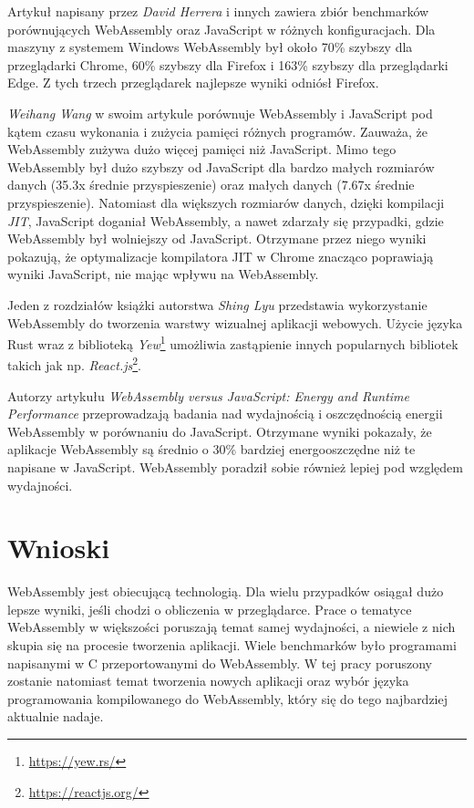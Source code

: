 \documentclass[language=polish,type=master]{aghmodern}
\begin{document}
Artykuł \cite{wasm_js_bench} napisany przez \emph{David Herrera} i innych zawiera zbiór benchmarków porównujących WebAssembly oraz JavaScript w różnych konfiguracjach.
Dla maszyny z systemem Windows WebAssembly był około 70\% szybszy dla przeglądarki Chrome, 60\% szybszy dla Firefox i 163\% szybszy dla przeglądarki Edge.
Z tych trzech przeglądarek najlepsze wyniki odniósł Firefox.

\emph{Weihang Wang} w swoim artykule \cite{wasm_js_bench2} porównuje WebAssembly i JavaScript pod kątem czasu wykonania i zużycia pamięci różnych programów.
Zauważa, że WebAssembly zużywa dużo więcej pamięci niż JavaScript.
Mimo tego WebAssembly był dużo szybszy od JavaScript dla bardzo małych rozmiarów danych (35.3x średnie przyspieszenie) oraz małych danych (7.67x średnie przyspieszenie).
Natomiast dla większych rozmiarów danych, dzięki kompilacji \emph{JIT}\footnotemark{}, JavaScript doganiał WebAssembly, a nawet zdarzały się przypadki, gdzie WebAssembly był wolniejszy od JavaScript.
Otrzymane przez niego wyniki pokazują, że optymalizacje kompilatora JIT w Chrome znacząco poprawiają wyniki JavaScript, nie mając wpływu na WebAssembly.

Jeden z rozdziałów książki \cite{wasm_yew} autorstwa \emph{Shing Lyu} przedstawia wykorzystanie WebAssembly do tworzenia warstwy wizualnej aplikacji webowych.
Użycie języka Rust wraz z biblioteką \emph{Yew}\footnote{\url{https://yew.rs/}} umożliwia zastąpienie innych popularnych bibliotek takich jak np. \emph{React.js}\footnote{\url{https://reactjs.org/}}.

Autorzy artykułu \cite{wasm_energy} \emph{WebAssembly versus JavaScript: Energy and Runtime Performance} przeprowadzają badania nad wydajnością i oszczędnością energii WebAssembly w porównaniu do JavaScript.
Otrzymane wyniki pokazały, że aplikacje WebAssembly są średnio o 30\% bardziej energooszczędne niż te napisane w JavaScript.
WebAssembly poradził sobie również lepiej pod względem wydajności.

\section{Wnioski}
WebAssembly jest obiecującą technologią.
Dla wielu przypadków osiągał dużo lepsze wyniki, jeśli chodzi o obliczenia w przeglądarce.
Prace o tematyce WebAssembly w większości poruszają temat samej wydajności, a niewiele z nich skupia się na procesie tworzenia aplikacji.
Wiele benchmarków było programami napisanymi w C przeportowanymi\footnotemark{} do WebAssembly.
W tej pracy poruszony zostanie natomiast temat tworzenia nowych aplikacji oraz wybór języka programowania kompilowanego do WebAssembly, który się do tego najbardziej aktualnie nadaje.
\end{document}
